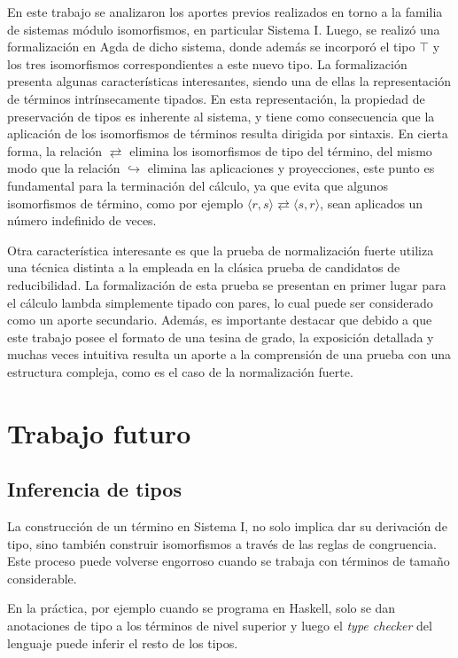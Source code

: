 En este trabajo se analizaron los aportes previos realizados en torno a la familia de sistemas módulo isomorfismos, en particular Sistema I.
Luego, se realizó una formalización en Agda de dicho sistema, donde además se incorporó el tipo $\top$ y los tres isomorfismos correspondientes a este nuevo tipo.
La formalización presenta algunas características interesantes, siendo una de ellas la representación de términos intrínsecamente tipados.
En esta representación, la propiedad de preservación de tipos es inherente al sistema, y tiene como consecuencia que la aplicación de los isomorfismos de términos resulta dirigida por sintaxis.
En cierta forma, la relación $\rightleftarrows$ elimina los isomorfismos de tipo del término, del mismo modo que la relación $\hookrightarrow$ elimina las aplicaciones y proyecciones, este punto es fundamental para la terminación del cálculo, ya que evita que algunos isomorfismos de término, como por ejemplo $\langle r,s \rangle\rightleftarrows\langle s,r \rangle$, sean aplicados un número indefinido de veces.

Otra característica interesante es que la prueba de normalización fuerte utiliza una técnica distinta a la empleada en la clásica prueba de candidatos de reducibilidad.
La formalización de esta prueba se presentan en primer lugar para el cálculo lambda simplemente tipado con pares, lo cual puede ser considerado como un aporte secundario.
Además, es importante destacar que debido a que este trabajo posee el formato de una tesina de grado, la exposición detallada y muchas veces intuitiva resulta un aporte a la comprensión de una prueba con una estructura compleja, como es el caso de la normalización fuerte.

\section{Trabajo futuro}

\subsection{Inferencia de tipos}

La construcción de un término en Sistema I, no solo implica dar su derivación de tipo, sino también construir isomorfismos a través de las reglas de congruencia.
Este proceso puede volverse engorroso cuando se trabaja con términos de tamaño considerable.

En la práctica, por ejemplo cuando se programa en Haskell, solo se dan anotaciones de tipo a los términos de nivel superior y luego el \textit{type checker} del lenguaje puede inferir el resto de los tipos.

